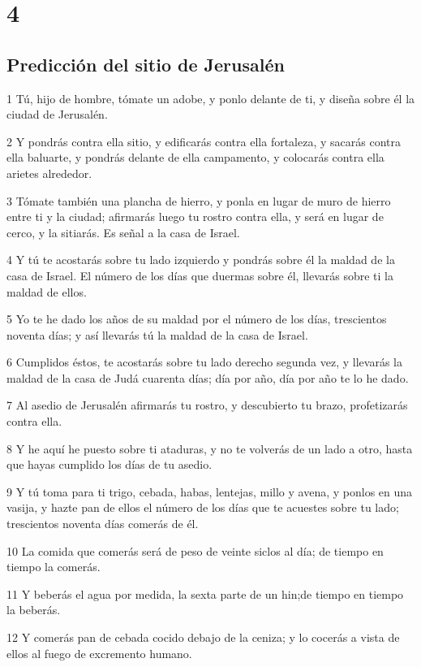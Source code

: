 \chapter{4}

\section*{Predicción del sitio de Jerusalén}

\par 1 Tú, hijo de hombre, tómate un adobe, y ponlo delante de ti, y diseña sobre él la ciudad de Jerusalén.
\par 2 Y pondrás contra ella sitio, y edificarás contra ella fortaleza, y sacarás contra ella baluarte, y pondrás delante de ella campamento, y colocarás contra ella arietes alrededor.
\par 3 Tómate también una plancha de hierro, y ponla en lugar de muro de hierro entre ti y la ciudad; afirmarás luego tu rostro contra ella, y será en lugar de cerco, y la sitiarás. Es señal a la casa de Israel.
\par 4 Y tú te acostarás sobre tu lado izquierdo y pondrás sobre él la maldad de la casa de Israel. El número de los días que duermas sobre él, llevarás sobre ti la maldad de ellos.
\par 5 Yo te he dado los años de su maldad por el número de los días, trescientos noventa días; y así llevarás tú la maldad de la casa de Israel.
\par 6 Cumplidos éstos, te acostarás sobre tu lado derecho segunda vez, y llevarás la maldad de la casa de Judá cuarenta días; día por año, día por año te lo he dado.
\par 7 Al asedio de Jerusalén afirmarás tu rostro, y descubierto tu brazo, profetizarás contra ella.
\par 8 Y he aquí he puesto sobre ti ataduras, y no te volverás de un lado a otro, hasta que hayas cumplido los días de tu asedio.
\par 9 Y tú toma para ti trigo, cebada, habas, lentejas, millo y avena, y ponlos en una vasija, y hazte pan de ellos el número de los días que te acuestes sobre tu lado; trescientos noventa días comerás de él.
\par 10 La comida que comerás será de peso de veinte siclos al día; de tiempo en tiempo la comerás.
\par 11 Y beberás el agua por medida, la sexta parte de un hin;de tiempo en tiempo la beberás.
\par 12 Y comerás pan de cebada cocido debajo de la ceniza; y lo cocerás a vista de ellos al fuego de excremento humano.
